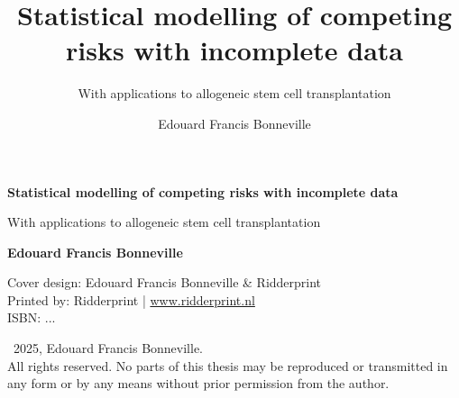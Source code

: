 \documentclass[
  letterpaper,
  paper=240mm:170mm,
  twoside=true,
  open=right,
  fontsize=10pt,
  pagesize=false,
  BCOR=15mm,
  DIV=14,
  headinclude=true,
  footinclude=false,
  headsepline=on]{scrbook}
\title{Statistical modelling of competing risks with incomplete data}
\subtitle{With applications to allogeneic stem cell transplantation}
\author{Edouard Francis Bonneville}
\date{}
\newcommand{\bsf}[1]{\textbf{\textsf{#1}}}
\begin{document}
\frontmatter


\begin{titlepage}
  \hspace{0pt}
  \vfill
  \begin{center}
    \bsf{\huge Statistical modelling of competing risks with incomplete
data} \par %
    \smallskip
    \textsf{\Large With applications to allogeneic stem cell
transplantation} \par
    \vfill
    \bsf{\large Edouard Francis Bonneville}
  \end{center}
\end{titlepage}


\clearpage
\thispagestyle{empty}
\vspace*{\fill} %

\begingroup
  \setlength{\parskip}{\baselineskip}
  \begin{flushleft}
    Cover design: Edouard Francis Bonneville \& Ridderprint \\
    Printed by: Ridderprint | \href{www.ridderprint.nl}{www.ridderprint.nl} \\
    ISBN: ...\par

    \textcopyright \ 2025, Edouard Francis Bonneville. \\
    All rights reserved. No parts of this thesis may be reproduced or transmitted in any form or by any means without prior permission from the author.
  \end{flushleft}
\endgroup


\clearpage
\thispagestyle{empty}
\end{document}
